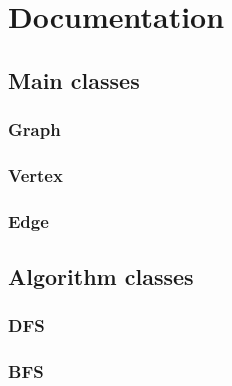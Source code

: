 \section*{Documentation}



\subsection*{Main classes}

\subsubsection*{Graph}



\subsubsection*{Vertex}



\subsubsection*{Edge}


\subsection*{Algorithm classes}

\subsubsection*{DFS}

\subsubsection*{BFS}